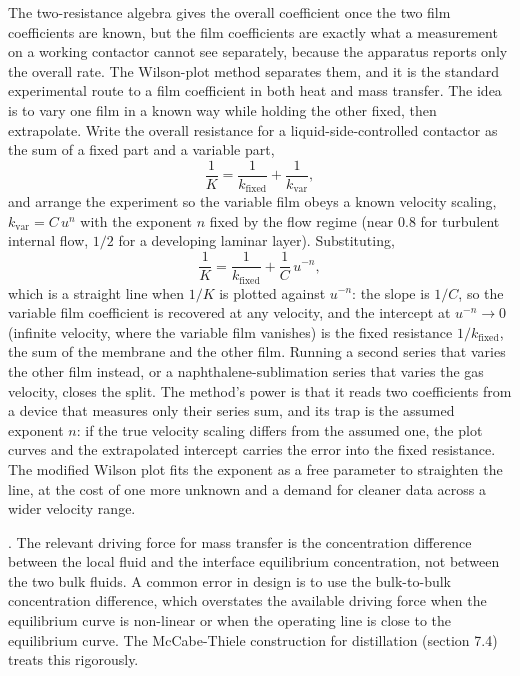\begin{mastery}
The two-resistance algebra gives the overall coefficient once the two film
coefficients are known, but the film coefficients are exactly what a
measurement on a working contactor cannot see separately, because the
apparatus reports only the overall rate. The Wilson-plot method separates
them, and it is the standard experimental route to a film coefficient in both
heat and mass transfer. The idea is to vary one film in a known way while
holding the other fixed, then extrapolate. Write the overall resistance for a
liquid-side-controlled contactor as the sum of a fixed part and a variable
part,
\[
\frac{1}{K} = \frac{1}{k_{\text{fixed}}} + \frac{1}{k_{\text{var}}},
\]
and arrange the experiment so the variable film obeys a known velocity
scaling, $k_{\text{var}} = C\,u^{n}$ with the exponent $n$ fixed by the flow
regime (near $0.8$ for turbulent internal flow, $1/2$ for a developing
laminar layer). Substituting,
\[
\frac{1}{K} = \frac{1}{k_{\text{fixed}}} + \frac{1}{C}\,u^{-n},
\]
which is a straight line when $1/K$ is plotted against $u^{-n}$: the slope is
$1/C$, so the variable film coefficient is recovered at any velocity, and the
intercept at $u^{-n} \to 0$ (infinite velocity, where the variable film
vanishes) is the fixed resistance $1/k_{\text{fixed}}$, the sum of the
membrane and the other film. Running a second series that varies the other
film instead, or a naphthalene-sublimation series that varies the gas
velocity, closes the split. The method's power is that it reads two
coefficients from a device that measures only their series sum, and its trap
is the assumed exponent $n$: if the true velocity scaling differs from the
assumed one, the plot curves and the extrapolated intercept carries the error
into the fixed resistance. The modified Wilson plot fits the exponent as a
free parameter to straighten the line, at the cost of one more unknown and a
demand for cleaner data across a wider velocity range.
\end{mastery}

. The relevant driving force for
mass transfer is the concentration difference between the local
fluid and the interface equilibrium concentration, not between the
two bulk fluids. A common error in design is to use the bulk-to-bulk
concentration difference, which overstates the available driving
force when the equilibrium curve is non-linear or when the operating
line is close to the equilibrium curve. The McCabe-Thiele
construction for distillation (section 7.4) treats this rigorously.

